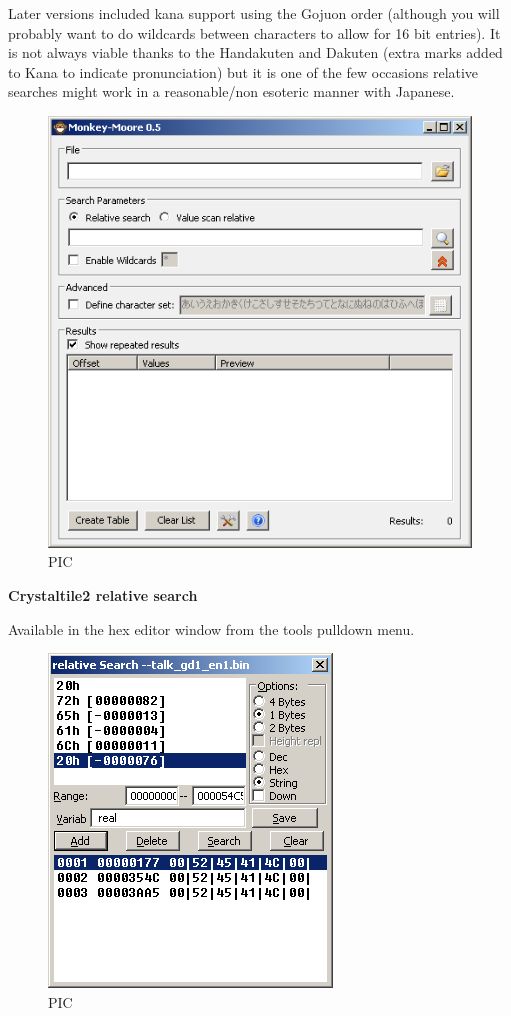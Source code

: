 \documentclass[
]{book}
\begin{document}
Later versions included kana support using the Gojuon order (although you will probably want to do wildcards between characters to allow for 16 bit entries). It is not always viable thanks to the Handakuten and Dakuten (extra marks added to Kana to indicate pronunciation) but it is one of the few occasions relative searches might work in a reasonable/non esoteric manner with Japanese.

\begin{figure}
\centering
\includegraphics{images/83_home_fast6191_romhackingguide_unrenamed_file___al_borders_romhackingguiderelativesearchmm6.png}
\caption{PIC}
\end{figure}

\textbf{Crystaltile2 relative search}

Available in the hex editor window from the tools pulldown menu.

\begin{figure}
\centering
\includegraphics{images/84_home_fast6191_romhackingguide_unrenamed_file___l_borders_romhackingguiderelativesearchct21.png}
\caption{PIC}
\end{figure}
\end{document}
